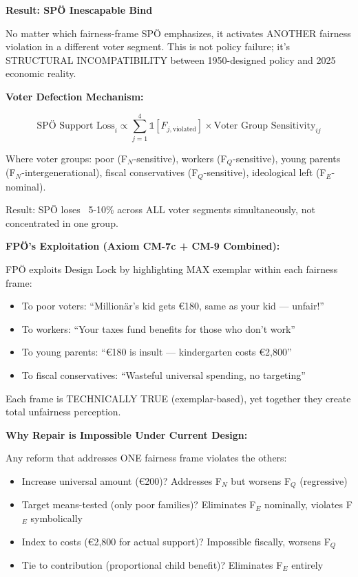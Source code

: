 \textbf{Result: SPÖ Inescapable Bind}

No matter which fairness-frame SPÖ emphasizes, it activates ANOTHER fairness violation in
a different voter segment. This is not policy failure; it's STRUCTURAL INCOMPATIBILITY
between 1950-designed policy and 2025 economic reality.

\textbf{Voter Defection Mechanism:}

\begin{equation}
\text{SPÖ Support Loss}_{i} \propto \sum_{j=1}^{4} \mathbb{1}[F_{j,\text{violated}}] \times
\text{Voter Group Sensitivity}_{ij}
\end{equation}

Where voter groups: poor (F$_N$-sensitive), workers (F$_Q$-sensitive), young parents (F$_N$-intergenerational),
fiscal conservatives (F$_Q$-sensitive), ideological left (F$_E$-nominal).

Result: SPÖ loses ~5-10\% across ALL voter segments simultaneously, not concentrated in one group.

\textbf{FPÖ's Exploitation (Axiom CM-7c + CM-9 Combined):}

FPÖ exploits Design Lock by highlighting MAX exemplar within each fairness frame:

\begin{itemize}[nosep]
\item To poor voters: ``Millionär's kid gets €180, same as your kid --- unfair!''
\item To workers: ``Your taxes fund benefits for those who don't work''
\item To young parents: ``€180 is insult --- kindergarten costs €2,800''
\item To fiscal conservatives: ``Wasteful universal spending, no targeting''
\end{itemize}

Each frame is TECHNICALLY TRUE (exemplar-based), yet together they create total
unfairness perception.

\textbf{Why Repair is Impossible Under Current Design:}

Any reform that addresses ONE fairness frame violates the others:

\begin{itemize}[nosep]
\item Increase universal amount (€200)? Addresses F$_N$ but worsens F$_Q$ (regressive)
\item Target means-tested (only poor families)? Eliminates F$_E$ nominally, violates F$_E$ symbolically
\item Index to costs (€2,800 for actual support)? Impossible fiscally, worsens F$_Q$
\item Tie to contribution (proportional child benefit)? Eliminates F$_E$ entirely
\end{itemize}

